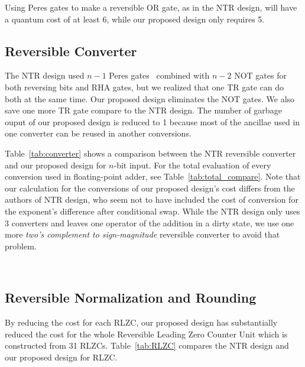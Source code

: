 \documentclass[%
reprint,
 amsmath,amssymb,
 aps,
]{revtex4-1}
\begin{document}
\par Using Peres gates to make a reversible OR gate, as in the NTR design, will have a quantum cost of at least 6, while our proposed design only requires 5. 

\subsection{Reversible Converter}

The NTR design used $n-1$ Peres gates~\cite{peres} combined with $n-2$ NOT gates for both reversing bits and RHA gates, but we realized that one TR gate can do both at the same time. Our proposed design eliminates the NOT gates. We also save one more TR gate compare to the NTR design. The number of garbage ouput of our proposed design is reduced to 1 because most of the ancillae used in one converter can be reused in another conversions. 

\par Table~\ref{tab:converter} shows a comparison between the NTR reversible converter and our proposed design for $n$-bit input. For the total evaluation of every conversion used in floating-point adder, see Table~\ref{tab:total_compare}. Note that our calculation for the conversions of our proposed design's cost differs from the authors of NTR design, who seem not to have included the cost of conversion for the exponent's difference after conditional swap. While the NTR design only uses 3 converters and leaves one operator of the addition in a dirty state, we use one more \emph{two's complement to sign-magnitude} reversible converter to avoid that problem.   



\begin{table}
\centering
{}
\\
\caption{NTR Converter vs Proposed Converter.}
\label{tab:converter}
\end{table}



\subsection{Reversible Normalization and Rounding}
By reducing the cost for each RLZC, our proposed design has substantially reduced the cost for the whole Reversible Leading Zero Counter Unit which is constructed from 31 RLZCs. Table~\ref{tab:RLZC} compares the NTR design and our proposed design for RLZC.
\end{document}
